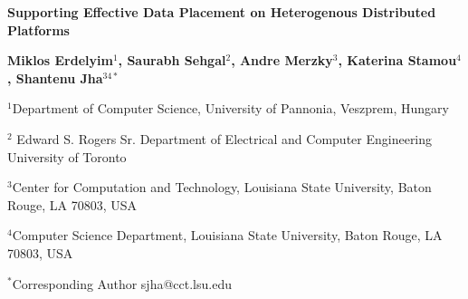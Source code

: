 \documentclass[a4paper,11pt]{article}
\begin{document}
\begin{center}
\textbf {\large \bf Supporting Effective Data Placement on Heterogenous Distributed Platforms}

\textbf {\normalsize \hspace{0.6 in} Miklos Erdelyim$^1$, Saurabh Sehgal$^2$, Andre Merzky$^3$,  \newline Katerina Stamou$^4$, Shantenu Jha$^{34*}$ }

\normalsize { \hspace{0.6 in} $^1$Department of Computer Science, \newline University of Pannonia, Veszprem, Hungary}

\normalsize { \hspace{0.6 in} $^2$ Edward S. Rogers Sr. Department of Electrical and Computer Engineering \newline University of Toronto}

\normalsize { \hspace{0.6 in} $^3$Center for Computation and Technology, \newline Louisiana State University, Baton Rouge, LA 70803, USA}

\normalsize {\hspace{0.6 in} $^4$Computer Science Department, \newline Louisiana State University, Baton Rouge, LA 70803, USA}

{\footnotesize {\hspace{0.0 in} $^*$Corresponding Author sjha@cct.lsu.edu}}

\end{center}


\vspace{12pt}
\end{document}
